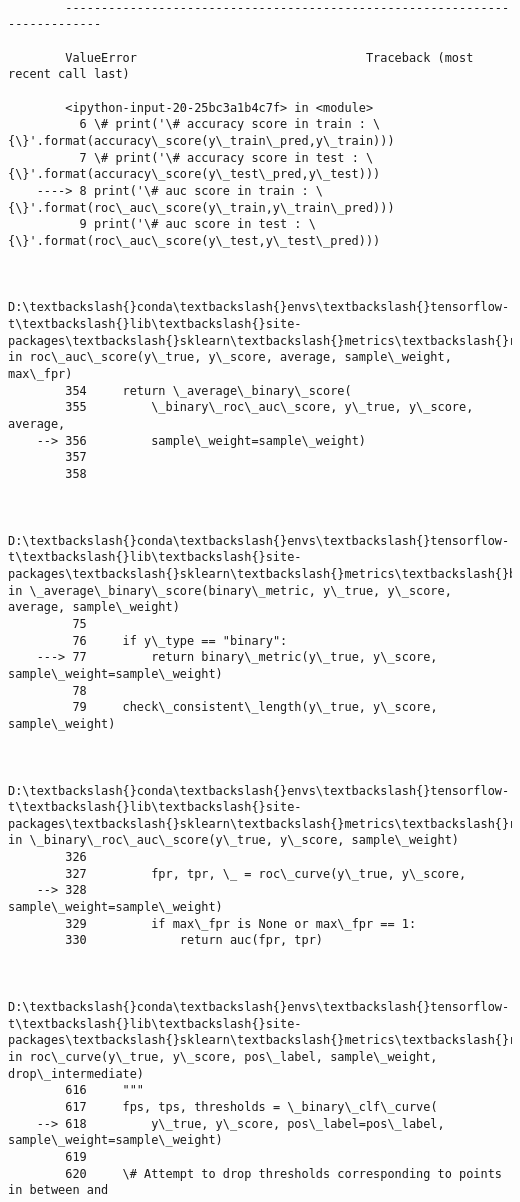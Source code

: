 \documentclass[11pt]{article}
\begin{document}
    \begin{Verbatim}[commandchars=\\\{\}]

        ---------------------------------------------------------------------------

        ValueError                                Traceback (most recent call last)

        <ipython-input-20-25bc3a1b4c7f> in <module>
          6 \# print('\# accuracy score in train : \{\}'.format(accuracy\_score(y\_train\_pred,y\_train)))
          7 \# print('\# accuracy score in test : \{\}'.format(accuracy\_score(y\_test\_pred,y\_test)))
    ----> 8 print('\# auc score in train : \{\}'.format(roc\_auc\_score(y\_train,y\_train\_pred)))
          9 print('\# auc score in test : \{\}'.format(roc\_auc\_score(y\_test,y\_test\_pred)))
    

        D:\textbackslash{}conda\textbackslash{}envs\textbackslash{}tensorflow-t\textbackslash{}lib\textbackslash{}site-packages\textbackslash{}sklearn\textbackslash{}metrics\textbackslash{}ranking.py in roc\_auc\_score(y\_true, y\_score, average, sample\_weight, max\_fpr)
        354     return \_average\_binary\_score(
        355         \_binary\_roc\_auc\_score, y\_true, y\_score, average,
    --> 356         sample\_weight=sample\_weight)
        357 
        358 
    

        D:\textbackslash{}conda\textbackslash{}envs\textbackslash{}tensorflow-t\textbackslash{}lib\textbackslash{}site-packages\textbackslash{}sklearn\textbackslash{}metrics\textbackslash{}base.py in \_average\_binary\_score(binary\_metric, y\_true, y\_score, average, sample\_weight)
         75 
         76     if y\_type == "binary":
    ---> 77         return binary\_metric(y\_true, y\_score, sample\_weight=sample\_weight)
         78 
         79     check\_consistent\_length(y\_true, y\_score, sample\_weight)
    

        D:\textbackslash{}conda\textbackslash{}envs\textbackslash{}tensorflow-t\textbackslash{}lib\textbackslash{}site-packages\textbackslash{}sklearn\textbackslash{}metrics\textbackslash{}ranking.py in \_binary\_roc\_auc\_score(y\_true, y\_score, sample\_weight)
        326 
        327         fpr, tpr, \_ = roc\_curve(y\_true, y\_score,
    --> 328                                 sample\_weight=sample\_weight)
        329         if max\_fpr is None or max\_fpr == 1:
        330             return auc(fpr, tpr)
    

        D:\textbackslash{}conda\textbackslash{}envs\textbackslash{}tensorflow-t\textbackslash{}lib\textbackslash{}site-packages\textbackslash{}sklearn\textbackslash{}metrics\textbackslash{}ranking.py in roc\_curve(y\_true, y\_score, pos\_label, sample\_weight, drop\_intermediate)
        616     """
        617     fps, tps, thresholds = \_binary\_clf\_curve(
    --> 618         y\_true, y\_score, pos\_label=pos\_label, sample\_weight=sample\_weight)
        619 
        620     \# Attempt to drop thresholds corresponding to points in between and
    


\end{Verbatim}
\end{document}
